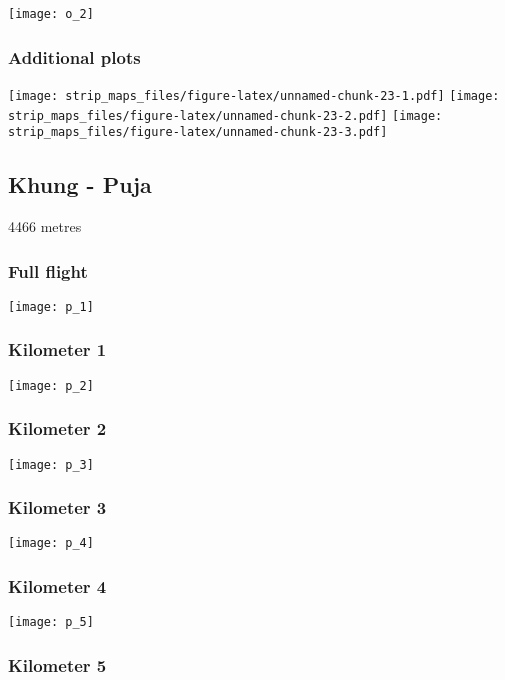 \documentclass[]{article}
\begin{document}
\texttt{[image: o\_2]}

\subsubsection{Additional plots}\label{additional-plots-14}

\texttt{[image: strip\_maps\_files/figure-latex/unnamed-chunk-23-1.pdf]}
\texttt{[image: strip\_maps\_files/figure-latex/unnamed-chunk-23-2.pdf]}
\texttt{[image: strip\_maps\_files/figure-latex/unnamed-chunk-23-3.pdf]}

\newpage

\subsection{Khung - Puja}\label{khung---puja}

4466 metres

\subsubsection{Full flight}\label{full-flight-15}

\texttt{[image: p\_1]}

\subsubsection{Kilometer 1}\label{kilometer-1-15}

\texttt{[image: p\_2]}

\subsubsection{Kilometer 2}\label{kilometer-2-15}

\texttt{[image: p\_3]}

\subsubsection{Kilometer 3}\label{kilometer-3-15}

\texttt{[image: p\_4]}

\subsubsection{Kilometer 4}\label{kilometer-4-15}

\texttt{[image: p\_5]}

\subsubsection{Kilometer 5}\label{kilometer-5-15}
\end{document}
